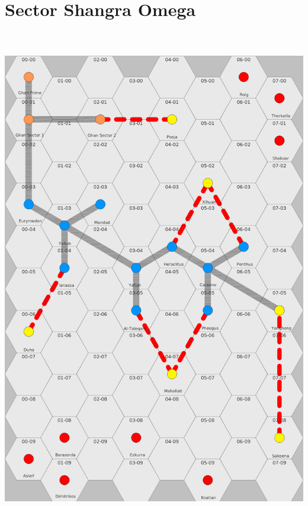 \documentclass[10pt,twoside]{article}
\begin{document}
  \newpage


  \section{Sector Shangra Omega}

  \begin{center}
    \includegraphics[height=220mm]{sectormap}
  \end{center}

  \newpage
\end{document}
